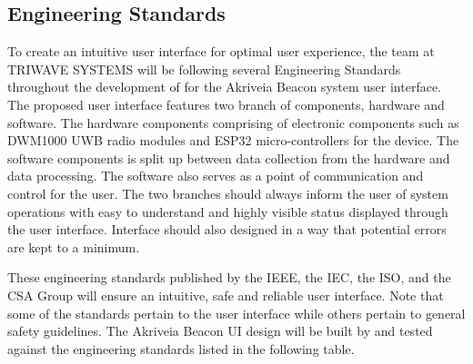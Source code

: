 

\subsection{Engineering Standards}
\bigskip
To create an intuitive user interface for optimal user experience, the team at TRIWAVE SYSTEMS will be following several Engineering Standards throughout the development of for the Akriveia Beacon system user interface. The proposed user interface features two branch of components, hardware and software. The hardware components comprising of electronic components such as DWM1000 UWB radio modules and ESP32 micro-controllers for the device. The software components is split up between data collection from the hardware and data processing. The software also serves as a point of communication and control for the user. The two branches should always inform the user of system operations with easy to understand and highly visible status displayed through the user interface. Interface should also designed in a way that potential errors are kept to a minimum.

\bigskip
These engineering standards published by the \Gls{IEEE}, the \Gls{IEC}, the \Gls{ISO}, and the \Gls{CSA} Group will ensure an intuitive, safe and reliable user interface. Note that some of the standards pertain to the user interface while others pertain to general safety guidelines. The Akriveia Beacon UI design will be built by and tested against the engineering standards listed in the following table.
\bigskip

